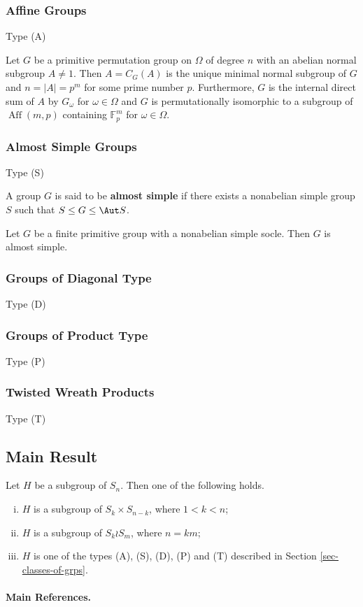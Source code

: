 \subsubsection{Affine Groups}

Type (A)


\begin{proposition}
	Let $ G $ be a primitive permutation group on $ \Omega $ of degree $ n $ with an abelian normal subgroup $ A \neq 1 $. Then $ A = C_G(A) $ is the unique minimal normal subgroup of $ G $ and $ n = |A| = p^m $ for some prime number $ p $. Furthermore, $G$ is the internal direct sum of $A$ by $G_\omega$ for $\omega\in\Omega$ and $G$ is permutationally isomorphic to a subgroup of $\operatorname{Aff}(m,p) $ containing $ \mathbb{F}_p^m$ for $ \omega \in \Omega $.
\end{proposition}
\subsubsection{Almost Simple Groups}
Type (S)
\begin{definition}
	A group $G$ is said to be \textbf{almost simple} if there exists a nonabelian simple group $S$ such that $S\leq G\leq \Aut S$.
\end{definition}
\begin{proposition} 
	Let $G$ be a finite primitive group with a nonabelian simple socle. Then $G$ is almost simple.
\end{proposition}

\subsubsection{Groups of Diagonal Type}
Type (D)

\subsubsection{Groups of Product Type}
Type (P)

\subsubsection{Twisted Wreath Products}
Type (T)

\subsection{Main Result}
\begin{theorem}
	 Let $H$ be a subgroup of $S_n$. Then one of the following holds.
	\begin{enumerate}[(i)]
		\item $H$ is a subgroup of $S_k \times S_{n-k}$, where $1<k<n$;
		\item $H$ is a subgroup of $S_k \wr S_m$, where $n = km$;
		\item $H$ is one of the types (A), (S), (D), (P) and (T) described in Section \ref{sec-classes-of-grps}.
	\end{enumerate}
\end{theorem}

\paragraph{Main References.} \cite{Wilson2009,Cameron1999,Smith2018,Liebeck1988,Aschbacher1985}